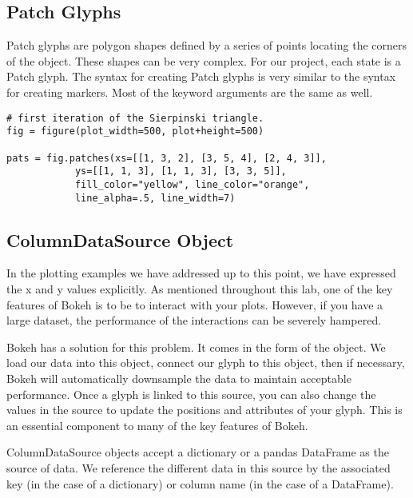\subsection*{Patch Glyphs}
Patch glyphs are polygon shapes defined by a series of points locating the
corners of the object. These shapes can be very complex. For our project, each
state is a Patch glyph. The syntax for creating Patch glyphs is very similar to
the syntax for creating markers. Most of the keyword arguments are the same as
well.

\begin{lstlisting}
# first iteration of the Sierpinski triangle.
fig = figure(plot_width=500, plot+height=500)

pats = fig.patches(xs=[[1, 3, 2], [3, 5, 4], [2, 4, 3]],
            ys=[[1, 1, 3], [1, 1, 3], [3, 3, 5]],
            fill_color="yellow", line_color="orange",
            line_alpha=.5, line_width=7)
\end{lstlisting}

\subsection*{ColumnDataSource Object}
In the plotting examples we have addressed up to this point, we have expressed
the x and y values explicitly. As mentioned throughout this lab, one of the key
features of Bokeh is to be to interact with your plots. However, if you have
a large dataset, the performance of the interactions can be severely hampered.

Bokeh has a solution for this problem. It comes in the form of the
 object. We load our data into this object, connect our
glyph to this object, then if necessary, Bokeh will automatically downsample the
data to maintain acceptable performance. Once a glyph is linked to this source,
you can also change the values in the source to update the positions and attributes
of your glyph. This is an essential component to many of the key features of
Bokeh.

ColumnDataSource objects accept a dictionary or a pandas DataFrame as the source
of data. We reference the different data in this source by the associated key
(in the case of a dictionary) or column name (in the case of a DataFrame).


